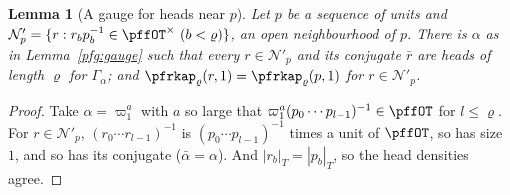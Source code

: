 \documentclass[10pt]{amsart}
\newtheorem{lemma}[theorem]{Lemma}
\theoremstyle{definition}
\theoremstyle{remark}
\begin{document}
\begin{lemma}[A gauge for heads near $p$]\label{pfg:headgauge}
Let $p$ be a sequence of units and $\mathcal N'_p=\{r:r_bp_b^{-1}\in\pffOT^\times\ (b<\varrho)\}$, an open neighbourhood of $p$.
There is $\alpha$ as in Lemma~\ref{pfg:gauge} such that every $r\in\mathcal N'_p$ and its conjugate $\bar r$ are heads of length
$\varrho$ for $\Gamma_\alpha$; and $\pfrkap_\varrho(r,1)=\pfrkap_\varrho(p,1)$ for $r\in\mathcal N'_p$.
\end{lemma}
\begin{proof}
Take $\alpha=\varpi_1^a$ with $a$ so large that $\varpi_1^a(p_0\cdots p_{l-1})^{-1}\in\pffOT$ for $l\le\varrho$. For $r\in\mathcal N'_p$,
$(r_0\cdots r_{l-1})^{-1}$ is $(p_0\cdots p_{l-1})^{-1}$ times a unit of $\pffOT$, so has size $1$, and so has its conjugate
($\bar\alpha=\alpha$). And $|r_b|_T=|p_b|_T$, so the head densities agree.
\end{proof}
\end{document}
